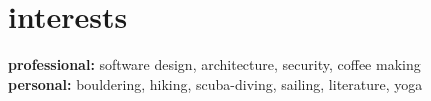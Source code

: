 \documentclass[]{friggeri-cv} %
\begin{document}

\section{interests}
\textbf{professional:} software design, architecture, security, coffee making
\\
\textbf{personal:} bouldering, hiking, scuba-diving, sailing, literature, yoga









\end{document}
